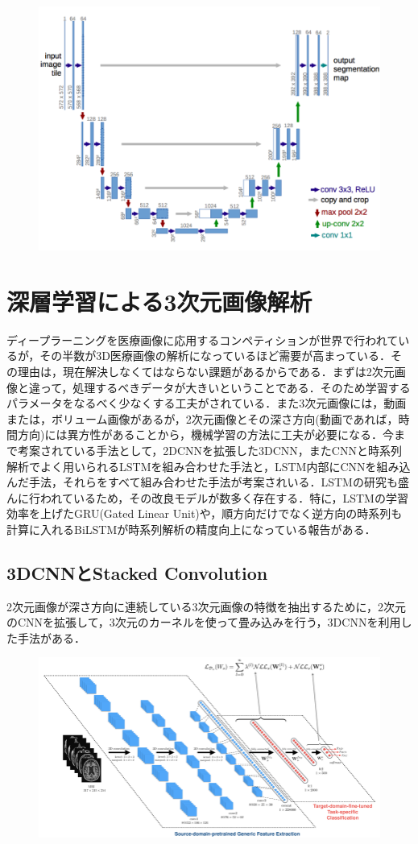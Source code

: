 \begin{figure}[h]
\centering
\includegraphics[width=0.7\linewidth]{fig/unet.png}
\caption{}
\label{fig:Unet}
\end{figure}

\section{深層学習による3次元画像解析}
ディープラーニングを医療画像に応用するコンペティションが世界で行われているが，その半数が3D医療画像の解析になっているほど需要が高まっている．その理由は，現在解決しなくてはならない課題があるからである．まずは2次元画像と違って，処理するべきデータが大きいということである．そのため学習するパラメータをなるべく少なくする工夫がされている．また3次元画像には，動画または，ボリューム画像があるが，2次元画像とその深さ方向(動画であれば，時間方向)には異方性があることから，機械学習の方法に工夫が必要になる．今まで考案されている手法として，2DCNNを拡張した3DCNN，またCNNと時系列解析でよく用いられるLSTMを組み合わせた手法と，LSTM内部にCNNを組み込んだ手法，それらをすべて組み合わせた手法が考案されいる．LSTMの研究も盛んに行われているため，その改良モデルが数多く存在する．特に，LSTMの学習効率を上げたGRU(Gated Linear Unit)や，順方向だけでなく逆方向の時系列も計算に入れるBiLSTMが時系列解析の精度向上になっている報告がある．


\subsection{3DCNNとStacked Convolution}
2次元画像が深さ方向に連続している3次元画像の特徴を抽出するために，2次元のCNNを拡張して，3次元のカーネルを使って畳み込みを行う，3DCNNを利用した手法がある．

\begin{figure}[h]
\centering
\includegraphics[width=0.7\linewidth]{fig/3d_cnn.png}
\caption{}
\label{fig:}
\end{figure}


